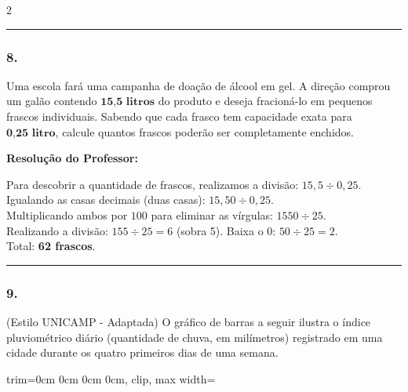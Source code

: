 \begin{multicols*}{2}
\par\vspace{\espacoQuestao}

\noindent\textcolor{CorLinha}{\rule{\linewidth}{0.5pt}} 
\par\vspace{\espacoPreQuestao}
\subsubsection*{8.} Uma escola fará uma campanha de doação de álcool em gel. A direção comprou um galão contendo $ \textbf{15,5 litros} $ do produto e deseja fracioná-lo em pequenos frascos individuais. Sabendo que cada frasco tem capacidade exata para $ \textbf{0,25 litro} $, calcule quantos frascos poderão ser completamente enchidos.

\ifgabarito
    \begin{tcolorbox}[colback=CorTitUm!5, colframe=CorTitUm, boxrule=1pt, arc=4pt, left=6pt, right=6pt, top=6pt, bottom=6pt]
    \small\textbf{\textcolor{CorTitUm}{Resolução do Professor:}}\par\vspace{0.1cm}
    \color{CinzaEscuro}
    Para descobrir a quantidade de frascos, realizamos a divisão: $ 15,5 \div 0,25 $.\\
    Igualando as casas decimais (duas casas): $ 15,50 \div 0,25 $.\\
    Multiplicando ambos por $ 100 $ para eliminar as vírgulas: $ 1550 \div 25 $.\\
    Realizando a divisão: $ 155 \div 25 = 6 $ (sobra 5). Baixa o 0: $ 50 \div 25 = 2 $.\\
    Total: \textbf{62 frascos}.
    \end{tcolorbox}
\fi

\par\vspace{\espacoQuestao}

\noindent\textcolor{CorLinha}{\rule{\linewidth}{0.5pt}} 
\par\vspace{\espacoPreQuestao}
\subsubsection*{9.} (Estilo UNICAMP - Adaptada) O gráfico de barras a seguir ilustra o índice pluviométrico diário (quantidade de chuva, em milímetros) registrado em uma cidade durante os quatro primeiros dias de uma semana.
\begin{center}
\begin{adjustbox}{trim=0cm 0cm 0cm 0cm, clip, max width=\larguraTikz}
\end{adjustbox}
\end{center}
\end{multicols*}
